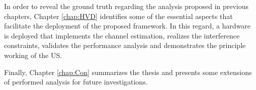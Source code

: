  
In order to reveal the ground truth regarding the analysis proposed in previous chapters, Chapter \ref{chap:HVD} identifies some of the essential aspects that facilitate the deployment of the proposed framework. In this regard, a hardware is deployed that implements the channel estimation, realizes the interference constraints, validates the performance analysis and demonstrates the principle working of the US.   

Finally, Chapter \ref{chap:Con} summarizes the thesis and presents some extensions of performed analysis for future investigations. 
